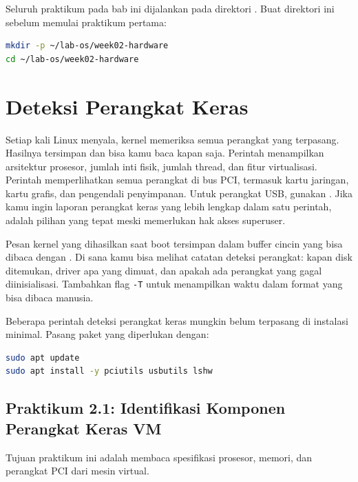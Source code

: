 \begin{notebox}
Seluruh praktikum pada bab ini dijalankan pada direktori .
Buat direktori ini sebelum memulai praktikum pertama:
\begin{lstlisting}[language=bash]
mkdir -p ~/lab-os/week02-hardware
cd ~/lab-os/week02-hardware
\end{lstlisting}
\end{notebox}

\section{Deteksi Perangkat Keras}
\label{sec:hardware-detection}

Setiap kali Linux menyala, kernel memeriksa semua perangkat yang terpasang. Hasilnya tersimpan dan bisa kamu baca kapan saja. Perintah  menampilkan arsitektur prosesor, jumlah inti fisik, jumlah thread, dan fitur virtualisasi. Perintah  memperlihatkan semua perangkat di bus PCI, termasuk kartu jaringan, kartu grafis, dan pengendali penyimpanan. Untuk perangkat USB, gunakan . Jika kamu ingin laporan perangkat keras yang lebih lengkap dalam satu perintah,  adalah pilihan yang tepat meski memerlukan hak akses superuser.

Pesan kernel yang dihasilkan saat boot tersimpan dalam buffer cincin yang bisa dibaca dengan . Di sana kamu bisa melihat catatan deteksi perangkat: kapan disk ditemukan, driver apa yang dimuat, dan apakah ada perangkat yang gagal diinisialisasi. Tambahkan flag \texttt{-T} untuk menampilkan waktu dalam format yang bisa dibaca manusia.

\begin{tipbox}
Beberapa perintah deteksi perangkat keras mungkin belum terpasang di instalasi minimal. Pasang paket yang diperlukan dengan:
\begin{lstlisting}[language=bash]
sudo apt update
sudo apt install -y pciutils usbutils lshw
\end{lstlisting}
\end{tipbox}

\subsection*{Praktikum 2.1: Identifikasi Komponen Perangkat Keras VM}

Tujuan praktikum ini adalah membaca spesifikasi prosesor, memori, dan perangkat PCI dari mesin virtual.

